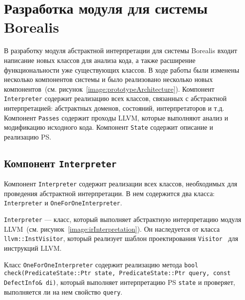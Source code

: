 \section{Разработка модуля для системы Borealis}
В разработку модуля абстрактной интерпретации для системы Borealis входит 
написание новых классов для анализа кода, а также расширение функциональности 
уже существующих классов. В ходе работы были изменены несколько компонентов 
системы и было реализовано несколько новых компонентов~(см. 
рисунок~\ref{image:prototypeArchitecture}). Компонент \texttt{Interpreter}
содержит реализацию всех классов, связанных с абстрактной интерпретацией:
абстрактных доменов, состояний, интерпретаторов и  т.д. Компонент \texttt{Passes}
содержит проходы LLVM, которые выполняют анализ и модификацию исходного кода.
Компонент \texttt{State} содержит описание и реализацию PS.

\subsection{Компонент \texttt{Interpreter}}
Компонент \texttt{Interpreter} содержит реализации всех классов, необходимых для
проведения абстрактной интерпретации. В нем содержится два класса: 
\texttt{Interpreter} и \texttt{OneForOneInterpreter}. 

\texttt{Interpreter} --- класс, который выполняет абстрактную интерпретацию 
модуля LLVM~(см. рисунок~\ref{image:irInterpretation}). Он наследуется от класса
\texttt{llvm::InstVisitor}, который реализует шаблон проектирования 
\texttt{Visitor}~\cite{visitor} для инструкций LLVM.

Класс \texttt{OneForOneInterpreter} содержит реализацию метода
\texttt{bool check(PredicateState::Ptr state, PredicateState::Ptr query, const 
DefectInfo\& di)}, который выполняет интерпретацию PS \texttt{state} и 
проверяет, выполняется ли на нем свойство \texttt{query}.

